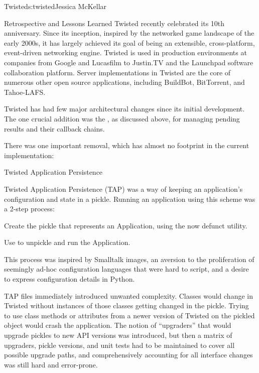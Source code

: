 \begin{aosachapter}{Twisted}{s:twisted}{Jessica McKellar}
\begin{aosasect1}{Retrospective and Lessons Learned}
Twisted recently celebrated its 10th anniversary. Since its inception,
inspired by the networked game landscape of the early 2000s, it has largely
achieved its goal of being an extensible, cross-platform, event-driven
networking engine. Twisted is used in production environments at companies from
Google and Lucasfilm to Justin.TV and the Launchpad software collaboration
platform. Server implementations in Twisted are the core of numerous other open
source applications, including BuildBot, BitTorrent, and Tahoe-LAFS.

Twisted has had few major architectural changes since its initial
development. The one crucial addition was the , as
discussed above, for managing pending results and their callback chains.

There was one important removal, which has almost no footprint in the current
implementation:

\begin{aosasect2}{Twisted Application Persistence}

Twisted Application Persistence (TAP) was a way of keeping an application's
configuration and state in a pickle. Running an application using this scheme
was a 2-step process:

\begin{aosaenumerate}

\item Create the pickle that represents an Application, using the now
  defunct  utility.

\item Use  to unpickle and run the Application.

\end{aosaenumerate}

This process was inspired by Smalltalk images, an aversion to the
proliferation of seemingly ad-hoc configuration languages that were hard to
script, and a desire to express configuration details in Python.

TAP files immediately introduced unwanted complexity. Classes would change in
Twisted without instances of those classes getting changed in the pickle. Trying
to use class methods or attributes from a newer version of Twisted on the
pickled object would crash the application. The notion of ``upgraders'' that would
upgrade pickles to new API versions was introduced, but then a matrix of
upgraders, pickle versions, and unit tests had to be maintained to cover all
possible upgrade paths, and comprehensively accounting for all interface changes
was still hard and error-prone.


\end{aosasect2}
\end{aosasect1}
\end{aosachapter}
